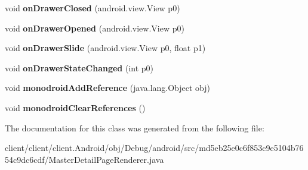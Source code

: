 \begin{DoxyCompactItemize}
\item 
\hypertarget{classmd5eb25e0c6f853c9e5104b7654c9dc6cdf_1_1MasterDetailPageRenderer_a792065a669e9805185ca18c559bf0d5c}{}void {\bfseries on\+Drawer\+Closed} (android.\+view.\+View p0)\label{classmd5eb25e0c6f853c9e5104b7654c9dc6cdf_1_1MasterDetailPageRenderer_a792065a669e9805185ca18c559bf0d5c}

\item 
\hypertarget{classmd5eb25e0c6f853c9e5104b7654c9dc6cdf_1_1MasterDetailPageRenderer_a741e7faf1adab657a258254a93244c4a}{}void {\bfseries on\+Drawer\+Opened} (android.\+view.\+View p0)\label{classmd5eb25e0c6f853c9e5104b7654c9dc6cdf_1_1MasterDetailPageRenderer_a741e7faf1adab657a258254a93244c4a}

\item 
\hypertarget{classmd5eb25e0c6f853c9e5104b7654c9dc6cdf_1_1MasterDetailPageRenderer_a4e47a74978cee8e1cca08a5097e73e20}{}void {\bfseries on\+Drawer\+Slide} (android.\+view.\+View p0, float p1)\label{classmd5eb25e0c6f853c9e5104b7654c9dc6cdf_1_1MasterDetailPageRenderer_a4e47a74978cee8e1cca08a5097e73e20}

\item 
\hypertarget{classmd5eb25e0c6f853c9e5104b7654c9dc6cdf_1_1MasterDetailPageRenderer_af88e7f98481de9fa377c0b518c72c175}{}void {\bfseries on\+Drawer\+State\+Changed} (int p0)\label{classmd5eb25e0c6f853c9e5104b7654c9dc6cdf_1_1MasterDetailPageRenderer_af88e7f98481de9fa377c0b518c72c175}

\item 
\hypertarget{classmd5eb25e0c6f853c9e5104b7654c9dc6cdf_1_1MasterDetailPageRenderer_a2222c9e909f022592e1f7e64120c0818}{}void {\bfseries monodroid\+Add\+Reference} (java.\+lang.\+Object obj)\label{classmd5eb25e0c6f853c9e5104b7654c9dc6cdf_1_1MasterDetailPageRenderer_a2222c9e909f022592e1f7e64120c0818}

\item 
\hypertarget{classmd5eb25e0c6f853c9e5104b7654c9dc6cdf_1_1MasterDetailPageRenderer_a95f0c47cb423d1abe8b706617e542439}{}void {\bfseries monodroid\+Clear\+References} ()\label{classmd5eb25e0c6f853c9e5104b7654c9dc6cdf_1_1MasterDetailPageRenderer_a95f0c47cb423d1abe8b706617e542439}

\end{DoxyCompactItemize}


The documentation for this class was generated from the following file\+:\begin{DoxyCompactItemize}
\item 
client/client/client.\+Android/obj/\+Debug/android/src/md5eb25e0c6f853c9e5104b7654c9dc6cdf/Master\+Detail\+Page\+Renderer.\+java\end{DoxyCompactItemize}
